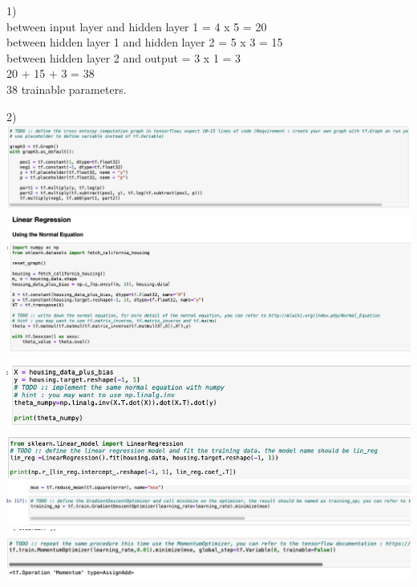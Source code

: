 \documentclass[11pt]{article}
\begin{document}
1) \\
between input layer and hidden layer 1 = 4 x 5 = 20 \\
between hidden layer 1 and hidden layer 2 = 5 x 3 = 15 \\
between hidden layer 2 and output = 3 x 1 = 3 \\
20 + 15 + 3 = 38 \\
38 trainable parameters.

2) \\
\includegraphics[scale= 0.35]{tf1new} \\
\includegraphics[scale= 0.35]{tf2} \\
\includegraphics[scale= 0.35]{tf3} \\
\includegraphics[scale= 0.35]{tf4} \\
\includegraphics[scale= 0.35]{tf5} \\
\includegraphics[scale= 0.35]{tf6} \\
\\ \\ \\ \\ \\ \\
\end{document}
